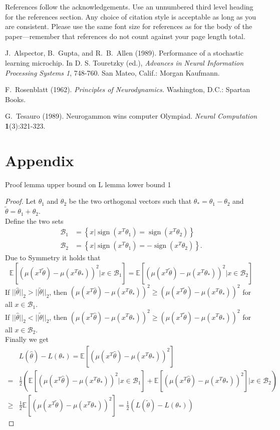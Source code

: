 \documentclass[twoside]{article} \usepackage{aistats2017}
\newcommand{\EV}[1] {
  \mathbb{E}\left[#1\right]}
\newcommand{\sign} {
  \operatorname{sign}}
\begin{document}
References follow the acknowledgements.  Use an unnumbered third level
heading for the references section.  Any choice of citation style is
acceptable as long as you are consistent.  Please use the same font
size for references as for the body of the paper---remember that
references do not count against your page length total.

J.~Alspector, B.~Gupta, and R.~B.~Allen (1989). Performance of a
stochastic learning microchip.  In D. S. Touretzky (ed.), {\it
  Advances in Neural Information Processing Systems 1}, 748-760.  San
Mateo, Calif.: Morgan Kaufmann.

F.~Rosenblatt (1962). {\it Principles of Neurodynamics.} Washington,
D.C.: Spartan Books.

G.~Tesauro (1989). Neurogammon wins computer Olympiad.  {\it Neural
  Computation} {\bf 1}(3):321-323.


\section{Appendix}

Proof lemma upper bound on L
lemma lower bound 1
\begin{proof}
Let $\theta_1$ and $\theta_2$ be the two orthogonal vectors such that $\theta_* = \theta_1-\theta_2$ and $\tilde{\theta}=\theta_1+\theta_2$.\\
Define the two sets
\begin{align*}
\mathcal{B}_1 &= \left\{x|\sign(x^T\theta_1)=\sign(x^T\theta_2)\right\}\\ 
\mathcal{B}_2 &= \left\{x|\sign(x^T\theta_1)=-\sign(x^T\theta_2)\right\}.
\end{align*}
Due to Symmetry it holds that 
$$\EV{(\mu(x^T\tilde{\theta})-\mu(x^T\theta_*))^2|x\in\mathcal{B}_1}=\EV{(\mu(x^T\tilde{\theta})-\mu(x^T\theta_*))^2|x\in\mathcal{B}_2}$$
If $||\hat{\theta}||_2 > ||\tilde{\theta}||_2$, then $(\mu(x^T\hat{\theta})-\mu(x^T\theta_*))^2 \geq (\mu(x^T\tilde{\theta})-\mu(x^T\theta_*))^2$ for all $x\in \mathcal{B}_1$.\\
If $||\hat{\theta}||_2 < ||\tilde{\theta}||_2$, then $(\mu(x^T\hat{\theta})-\mu(x^T\theta_*))^2 \geq (\mu(x^T\tilde{\theta})-\mu(x^T\theta_*))^2$ for all $x\in \mathcal{B}_2$.\\
Finally we get
\begin{align*}
     &L(\hat{\theta})-L(\theta_*) = \EV{(\mu(x^T\hat{\theta})-\mu(x^T\theta_*))^2}\\
     =& \frac{1}{2}\left(\EV{(\mu(x^T\hat{\theta})-\mu(x^T\theta_*))^2|x\in\mathcal{B}_1}+\EV{(\mu(x^T\hat{\theta})-\mu(x^T\theta_*))^2}|x\in\mathcal{B}_2\right)\\
     \geq& \frac{1}{2}\EV{(\mu(x^T\tilde{\theta})-\mu(x^T\theta_*))^2}=\frac{1}{2}(L(\tilde{\theta})-L(\theta_*))
\end{align*}
\end{proof}
\end{document}
